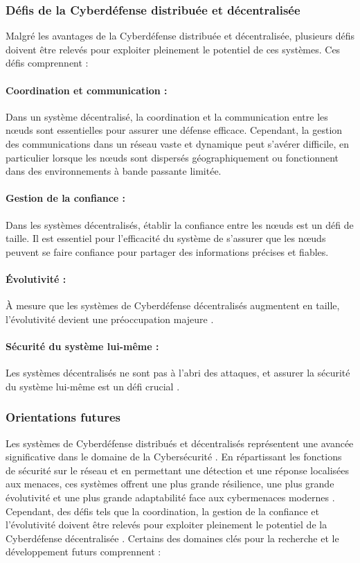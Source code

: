\subsubsection{Défis de la Cyberdéfense distribuée et décentralisée}

Malgré les avantages de la Cyberdéfense distribuée et décentralisée, plusieurs défis doivent être relevés pour exploiter pleinement le potentiel de ces systèmes. Ces défis comprennent :

\paragraph{Coordination et communication :}
Dans un système décentralisé, la coordination et la communication entre les nœuds sont essentielles pour assurer une défense efficace. Cependant, la gestion des communications dans un réseau vaste et dynamique peut s'avérer difficile, en particulier lorsque les nœuds sont dispersés géographiquement ou fonctionnent dans des environnements à bande passante limitée.

\paragraph{Gestion de la confiance :}
Dans les systèmes décentralisés, établir la confiance entre les nœuds est un défi de taille. Il est essentiel pour l'efficacité du système de s'assurer que les nœuds peuvent se faire confiance pour partager des informations précises et fiables.

\paragraph{Évolutivité :}
À mesure que les systèmes de Cyberdéfense décentralisés augmentent en taille, l'évolutivité devient une préoccupation majeure \cite{Bera2017}.

\paragraph{Sécurité du système lui-même :}
Les systèmes décentralisés ne sont pas à l'abri des attaques, et assurer la sécurité du système lui-même est un défi crucial \cite{Roman2013}.

\subsubsection{Orientations futures}

Les systèmes de Cyberdéfense distribués et décentralisés représentent une avancée significative dans le domaine de la Cybersécurité \cite{Christidis2016}. En répartissant les fonctions de sécurité sur le réseau et en permettant une détection et une réponse localisées aux menaces, ces systèmes offrent une plus grande résilience, une plus grande évolutivité et une plus grande adaptabilité face aux cybermenaces modernes \cite{Roman2013}. Cependant, des défis tels que la coordination, la gestion de la confiance et l'évolutivité doivent être relevés pour exploiter pleinement le potentiel de la Cyberdéfense décentralisée \cite{Xu2019}.
Certains des domaines clés pour la recherche et le développement futurs comprennent :

